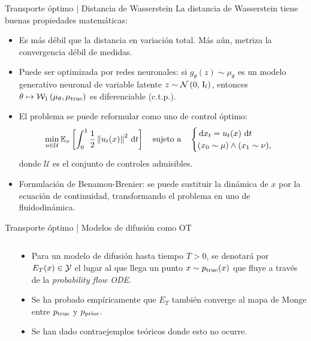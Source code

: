 \documentclass[aspectratio=43, 10pt]{beamer}
\begin{document}
\begin{frame}{Transporte óptimo | Distancia de Wasserstein}
    La distancia de Wasserstein tiene buenas propiedades matemáticas:
    \begin{itemize}
        \item<1> Es más débil que la distancia en variación total. Más aún, metriza la convergencia débil de medidas.
        \item<2> Puede ser optimizada por redes neuronales: si $g_\theta(z)\sim\mu_\theta$ es un modelo generativo neuronal de variable latente $z\sim\mathcal{N}\left(0,\,\operatorname{I}_{l}\right)$,  entonces $\theta\mapsto\mathcal{W}_{1}\left(\mu_\theta,\mu_{\text{true}}\right)$ es diferenciable (c.t.p.).
        \item<4,5> El problema se puede reformular como uno de control óptimo:
        \begin{equation*}
        \min_{u\in\mathcal{U}} \mathbb{E}_{x}\left[\int_0^1 \frac{1}{2}\left\lVert u_t(x) \right\rVert^2 \,\operatorname{d}\! t\right]
        \quad\text{sujeto a}\quad
        \begin{cases}
            \,\operatorname{d}\! x_t = u_t(x) \,\operatorname{d}\! t\\
            (x_0\sim\mu) \wedge (x_1\sim\nu),
        \end{cases}
    \end{equation*}
    donde $\mathcal{U}$ es el conjunto de controles admisibles.
        \item<5> Formulación de Benamou-Brenier: se puede sustituir la dinámica de $x$ por la ecuación de continuidad, transformando el problema en uno de fluidodinámica.
    \end{itemize}
\end{frame}

\begin{frame}{Transporte óptimo | Modelos de difusión como OT}

    \begin{columns}
        \begin{column}{0.39\textwidth}
        \end{column}
        \begin{column}{0.6\textwidth}
            \begin{itemize}
                \item<1> Para un modelo de difusión hasta tiempo $T>0$, se denotará por $E_{T}(x)\in\mathcal{Y}$ el lugar al que llega un punto $x\sim p_{\operatorname{true}}(x)$ que fluye a través de la \textit{probability flow ODE}.
                \item<2> Se ha probado empíricamente que $E_T$ también converge al mapa de Monge entre $p_{\operatorname{true}}$ y $p_{\operatorname{prior}}$.
                \item<3> Se han dado contraejemplos teóricos donde esto no ocurre.
            \end{itemize}
        \end{column}
    \end{columns}

\end{frame}
\end{document}
